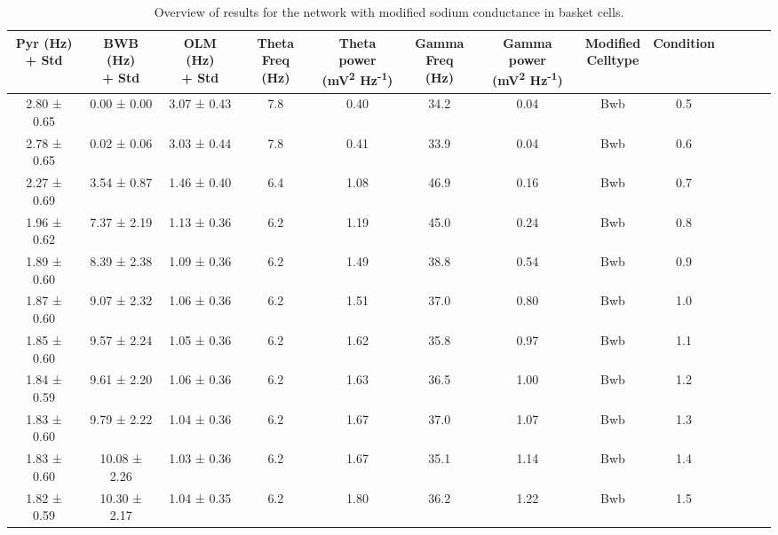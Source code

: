 \begin{table}[htbp]
    \caption[Sodium variant: Basket cell]{Overview of results for the network with modified sodium conductance in basket cells.}\label{table:NA_variant_bwb}
    \begin{adjustbox}{width=\textwidth}
        \begin{tabular}{ccccccccccccc}
            \hline
            \CellWithForcedBreak{Pyr (Hz)                                                   \\ + Std} & \CellWithForcedBreak{BWB (Hz) \\ + Std} & \CellWithForcedBreak{OLM (Hz) \\ + Std} & \CellWithForcedBreak{Theta \\ Freq (Hz)} & \CellWithForcedBreak{Theta power \\ (mV\textsuperscript{2} Hz\textsuperscript{-1})} & \CellWithForcedBreak{Gamma \\ Freq (Hz)} & \CellWithForcedBreak{Gamma power \\ (mV\textsuperscript{2} Hz\textsuperscript{-1})} & \CellWithForcedBreak{Modified \\ Celltype} & Condition \\
            \hline
            2.80 ± 0.65 & 0.00 ± 0.00  & 3.07 ± 0.43 & 7.8 & 0.40 & 34.2 & 0.04 & Bwb & 0.5 \\
            2.78 ± 0.65 & 0.02 ± 0.06  & 3.03 ± 0.44 & 7.8 & 0.41 & 33.9 & 0.04 & Bwb & 0.6 \\
            2.27 ± 0.69 & 3.54 ± 0.87  & 1.46 ± 0.40 & 6.4 & 1.08 & 46.9 & 0.16 & Bwb & 0.7 \\
            1.96 ± 0.62 & 7.37 ± 2.19  & 1.13 ± 0.36 & 6.2 & 1.19 & 45.0 & 0.24 & Bwb & 0.8 \\
            1.89 ± 0.60 & 8.39 ± 2.38  & 1.09 ± 0.36 & 6.2 & 1.49 & 38.8 & 0.54 & Bwb & 0.9 \\
            1.87 ± 0.60 & 9.07 ± 2.32  & 1.06 ± 0.36 & 6.2 & 1.51 & 37.0 & 0.80 & Bwb & 1.0 \\
            1.85 ± 0.60 & 9.57 ± 2.24  & 1.05 ± 0.36 & 6.2 & 1.62 & 35.8 & 0.97 & Bwb & 1.1 \\
            1.84 ± 0.59 & 9.61 ± 2.20  & 1.06 ± 0.36 & 6.2 & 1.63 & 36.5 & 1.00 & Bwb & 1.2 \\
            1.83 ± 0.60 & 9.79 ± 2.22  & 1.04 ± 0.36 & 6.2 & 1.67 & 37.0 & 1.07 & Bwb & 1.3 \\
            1.83 ± 0.60 & 10.08 ± 2.26 & 1.03 ± 0.36 & 6.2 & 1.67 & 35.1 & 1.14 & Bwb & 1.4 \\
            1.82 ± 0.59 & 10.30 ± 2.17 & 1.04 ± 0.35 & 6.2 & 1.80 & 36.2 & 1.22 & Bwb & 1.5 \\
            \hline
        \end{tabular}
    \end{adjustbox}
\end{table}
